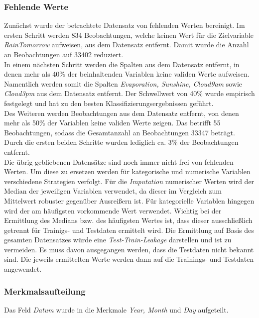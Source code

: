 \subsubsection{Fehlende Werte}
Zunächst wurde der betrachtete Datensatz von fehlenden Werten bereinigt. Im ersten Schritt werden 834 Beobachtungen, welche keinen Wert für die Zielvariable \emph{RainTomorrow} aufweisen, aus dem Datensatz entfernt. Damit wurde die Anzahl an Beobachtungen auf 33402 reduziert.\\
\noindent \hspace*{7mm}
In einem nächsten Schritt werden die Spalten aus dem Datensatz entfernt, in denen mehr als 40\% der beinhaltenden Variablen keine validen Werte aufweisen. Namentlich werden somit die Spalten \emph{Evaporation, Sunshine, Cloud9am} sowie \emph{Cloud3pm} aus dem Datensatz entfernt. Der Schwellwert von 40\% wurde empirisch festgelegt und hat zu den besten Klassifizierungsergebnissen geführt.\\
\noindent \hspace*{7mm}
Des Weiteren werden Beobachtungen aus dem Datensatz entfernt, von denen mehr als 50\% der Variablen keine validen Werte zeigen. Das betrifft 55 Beobachtungen, sodass die Gesamtanzahl an Beobachtungen 33347 beträgt. Durch die ersten beiden Schritte wurden lediglich ca. 3\% der Beobachtungen entfernt.\\
\noindent \hspace*{7mm}
Die übrig gebliebenen Datensätze sind noch immer nicht frei von fehlenden Werten. Um diese zu ersetzen werden für kategorische und numerische Variablen verschiedene Strategien verfolgt. Für die \emph{Imputation} numerischer Werten wird der Median der jeweiligen Variablen verwendet, da dieser im Vergleich zum Mittelwert robuster gegenüber Ausreißern ist. Für kategorielle Variablen hingegen wird der am häufigsten vorkommende Wert verwendet. Wichtig bei der Ermittlung des Medians bzw. des häufigsten Wertes ist, dass dieser ausschließlich getrennt für Trainigs- und Testdaten ermittelt wird. Die Ermittlung auf Basis des gesamten Datensatzes würde eine \emph{Test-Train-Leakage} darstellen und ist zu vermeiden. Es muss davon ausgegangen werden, dass die Testdaten nicht bekannt sind. Die jeweils ermittelten Werte werden dann auf die Trainings- und Testdaten angewendet.

\subsubsection{Merkmalsaufteilung}
Das Feld \emph{Datum} wurde in die Merkmale \emph{Year, Month} und \emph{Day} aufgeteilt.

